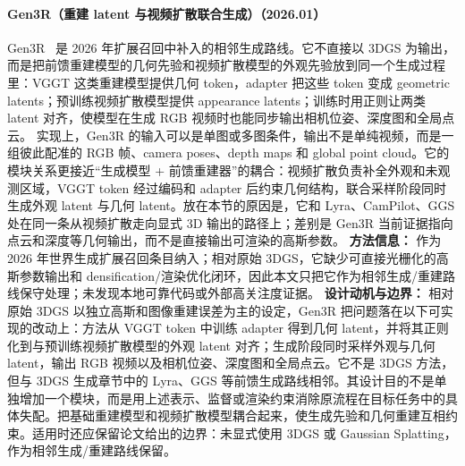 \paragraph{Gen3R（重建 latent 与视频扩散联合生成）（2026.01）}
Gen3R~\cite{2601_04090} 是 2026 年扩展召回中补入的相邻生成路线。它不直接以 3DGS 为输出，而是把前馈重建模型的几何先验和视频扩散模型的外观先验放到同一个生成过程里：VGGT 这类重建模型提供几何 token，adapter 把这些 token 变成 geometric latents；预训练视频扩散模型提供 appearance latents；训练时用正则让两类 latent 对齐，使模型在生成 RGB 视频时也能同步输出相机位姿、深度图和全局点云。
实现上，Gen3R 的输入可以是单图或多图条件，输出不是单纯视频，而是一组彼此配准的 RGB 帧、camera poses、depth maps 和 global point cloud。它的模块关系更接近“生成模型 + 前馈重建器”的耦合：视频扩散负责补全外观和未观测区域，VGGT token 经过编码和 adapter 后约束几何结构，联合采样阶段同时生成外观 latent 与几何 latent。放在本节的原因是，它和 Lyra、CamPilot、GGS 处在同一条从视频扩散走向显式 3D 输出的路径上；差别是 Gen3R 当前证据指向点云和深度等几何输出，而不是直接输出可渲染的高斯参数。
\textbf{方法信息：} 作为 2026 年世界生成扩展召回条目纳入；相对原始 3DGS，它缺少可直接光栅化的高斯参数输出和 densification/渲染优化闭环，因此本文只把它作为相邻生成/重建路线保守处理；未发现本地可靠代码或外部高关注度证据。
\textbf{设计动机与边界：} 相对原始 3DGS 以独立高斯和图像重建误差为主的设定，Gen3R 把问题落在以下可实现的改动上：方法从 VGGT token 中训练 adapter 得到几何 latent，并将其正则化到与预训练视频扩散模型的外观 latent 对齐；生成阶段同时采样外观与几何 latent，输出 RGB 视频以及相机位姿、深度图和全局点云。它不是 3DGS 方法，但与 3DGS 生成章节中的 Lyra、GGS 等前馈生成路线相邻。其设计目的不是单独增加一个模块，而是用上述表示、监督或渲染约束消除原流程在目标任务中的具体失配。把基础重建模型和视频扩散模型耦合起来，使生成先验和几何重建互相约束。适用时还应保留论文给出的边界：未显式使用 3DGS 或 Gaussian Splatting，作为相邻生成/重建路线保留。
